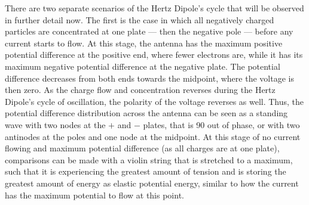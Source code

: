 There are two separate scenarios of the Hertz Dipole's cycle that will be observed in further detail now. The first is the case in which all negatively charged particles are concentrated at one plate --- then the negative pole --- before any current starts to flow. At this stage, the antenna has the maximum positive potential difference at the positive end, where fewer electrons are, while it has its maximum negative potential difference at the negative plate. The potential difference decreases from both ends towards the midpoint, where the voltage is then zero. As the charge flow and concentration reverses during the Hertz Dipole's cycle of oscillation, the polarity of the voltage reverses as well. Thus, the potential difference distribution across the antenna can be seen as a standing wave with two nodes at the $+$ and $-$ plates, that is 90\degree{} out of phase, or with two antinodes at the poles and one node at the midpoint. At this stage of no current flowing and maximum potential difference (as all charges are at one plate), comparisons can be made with a violin string that is stretched to a maximum, such that it is experiencing the greatest amount of tension and is storing the greatest amount of energy as elastic potential energy, similar to how the current has the maximum potential to flow at this point.

\begin{figure}[h!]
	\centering
	\hspace{1cm}
	\hspace{1cm}
\end{figure}

